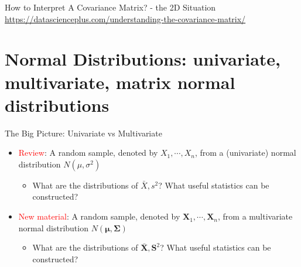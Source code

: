 \documentclass[
  ignorenonframetext,
]{beamer}
\providecommand{\tightlist}{%
  \setlength{\itemsep}{0pt}\setlength{\parskip}{0pt}}
\begin{document}
\begin{frame}{How to Interpret A Covariance Matrix? - the 2D Situation}
\protect\hypertarget{how-to-interpret-a-covariance-matrix---the-2d-situation}{}
\url{https://datascienceplus.com/understanding-the-covariance-matrix/}
\end{frame}

\hypertarget{normal-distributions-univariate-multivariate-matrix-normal-distributions}{%
\section{Normal Distributions: univariate, multivariate, matrix normal
distributions}\label{normal-distributions-univariate-multivariate-matrix-normal-distributions}}

\begin{frame}{The Big Picture: Univariate vs Multivariate}
\protect\hypertarget{the-big-picture-univariate-vs-multivariate}{}
\begin{itemize}
\tightlist
\item
  \textcolor{red}{Review}: A random sample, denoted by
  \(X_1, \cdots, X_n\), from a (univariate) normal distribution
  \(N(\mu, \sigma^2)\)

  \begin{itemize}
  \tightlist
  \item
    What are the distributions of \(\bar X, s^2\)? What useful
    statistics can be constructed?
  \end{itemize}
\item
  \textcolor{red}{New material}: A random sample, denoted by
  \(\mathbf X_1, \cdots, \mathbf X_n\), from a multivariate normal
  distribution \(N(\boldsymbol \mu, \boldsymbol \Sigma)\)

  \begin{itemize}
  \tightlist
  \item
    What are the distributions of \(\bar{\mathbf X}, \mathbf S^2\)? What
    useful statistics can be constructed?
  \end{itemize}
\end{itemize}
\end{frame}
\end{document}
